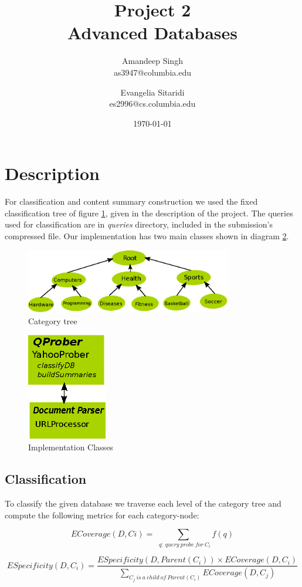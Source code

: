 \documentclass[11pt]{article}
\title{Project 2 \\ Advanced Databases \\}
\author{
Amandeep  Singh\\as3947@columbia.edu
\and
Evangelia  Sitaridi \\ es2996@cs.columbia.edu
}
\date{\today}
\begin{document}
\maketitle

\section{Description}
For classification and content summary construction we used the fixed classification tree of figure \ref{fig:tree}, given in the description of the project. The queries
used for classification are in \textit{queries} directory, included in the submission's compressed file. Our implementation has two main classes shown in diagram \ref{fig:classes}.

\begin{figure}[htb!]
\centering
\includegraphics[width=90mm]{cattree}
\caption{Category tree}
\label{fig:tree}
\end{figure}


\begin{figure}[htb!]
\centering
\includegraphics[width=35mm]{classes}
\caption{Implementation Classes}
\label{fig:classes}
\end{figure}

\subsection{Classification}
To classify the given database we traverse each level of the category tree and compute the following metrics for each category-node:

\[ECoverage(D,Ci)=\sum_{\ \ q: \ query \ probe \ for \ C_i}{f(q)} \]

\[ESpecificity(D, C_i ) = \frac{ESpecificity(D, Parent(C_i )) \times ECoverage(D, C_i )} {\sum_{C_j \  is \ a \ child \ of \ Parent(C_i)} {ECoverage(D,C_j)}} \]
\end{document}
